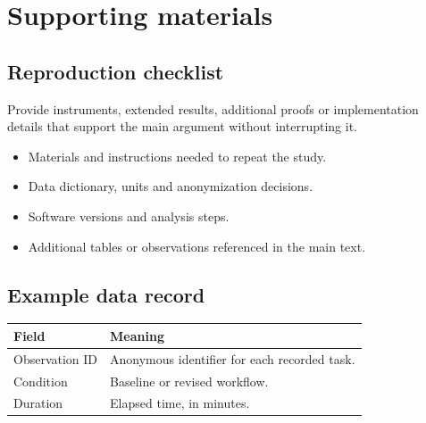 \appendix
\chapter{Supporting materials}
\label{app:materials}
\section{Reproduction checklist}
Provide instruments, extended results, additional proofs or implementation
details that support the main argument without interrupting it.
\begin{itemize}
\item Materials and instructions needed to repeat the study.
\item Data dictionary, units and anonymization decisions.
\item Software versions and analysis steps.
\item Additional tables or observations referenced in the main text.
\end{itemize}
\section{Example data record}
\begin{tabularx}{\linewidth}{@{}lX@{}}
\toprule
\textbf{Field} & \textbf{Meaning}\\
\midrule
Observation ID & Anonymous identifier for each recorded task.\\
Condition & Baseline or revised workflow.\\
Duration & Elapsed time, in minutes.\\
\bottomrule
\end{tabularx}
